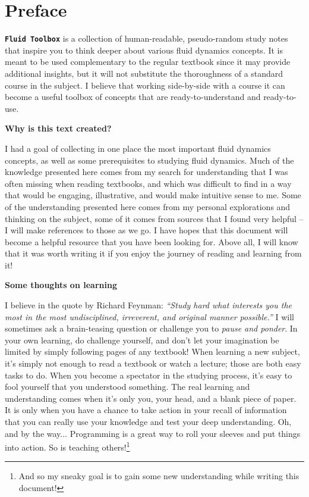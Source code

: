 \documentclass[12pt]{report}
\begin{document}
\setlength{\parskip}{0.6em}
\setlength{\parindent}{0cm}

\chapter*{Preface}
\thispagestyle{empty}



\texttt{\textbf{Fluid Toolbox}} is a collection of human-readable, pseudo-random study notes that inspire you to think deeper about various fluid dynamics concepts. It is meant to be used complementary to the regular textbook since it may provide additional insights, but it will not substitute the thoroughness of a standard course in the subject. I believe that working side-by-side with a course it can become a useful toolbox of concepts that are ready-to-understand and ready-to-use.

\textbf{Why is this text created?}

I had a goal of collecting in one place the most important fluid dynamics concepts, as well as some prerequisites to studying fluid dynamics. Much of the knowledge presented here comes from my search for understanding that I was often missing when reading textbooks, and which was difficult to find in a way that would be engaging, illustrative, and would make intuitive sense to me. Some of the understanding presented here comes from my personal explorations and thinking on the subject, some of it comes from sources that I found very helpful -- I will make references to those as we go. I have hopes that this document will become a helpful resource that you have been looking for. Above all, I will know that it was worth writing it if you enjoy the journey of reading and learning from it!

\textbf{Some thoughts on learning}

I believe in the quote by Richard Feynman: \textit{``Study hard what interests you the most in the most undisciplined, irreverent, and original manner possible.''} I will sometimes ask a brain-teasing question or challenge you to \textit{pause and ponder}. In your own learning, do challenge yourself, and don't let your imagination be limited by simply following pages of any textbook! When learning a new subject, it's simply not enough to read a textbook or watch a lecture; those are both easy tasks to do. When you become a spectator in the studying process, it's easy to fool yourself that you understood something. The real learning and understanding comes when it's only you, your head, and a blank piece of paper. It is only when you have a chance to take action in your recall of information that you can really use your knowledge and test your deep understanding. Oh, and by the way... Programming is a great way to roll your sleeves and put things into action. So is teaching others!\footnote{And so my sneaky goal is to gain some new understanding while writing this document!}
\end{document}
